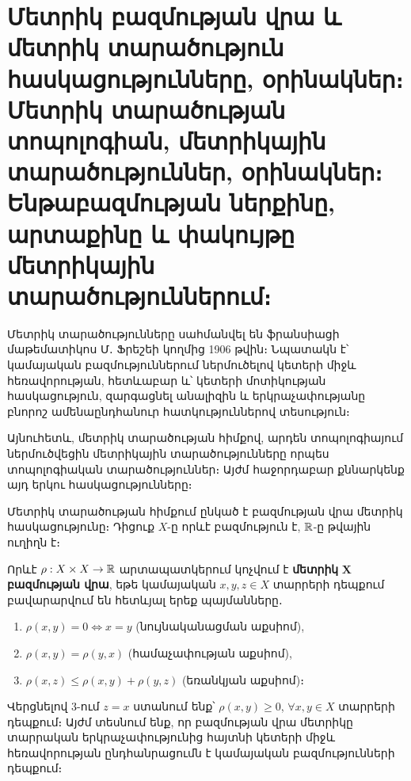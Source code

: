 \documentclass[./main.tex]{subfiles}
\begin{document}
\onehalfspacing


\section{Մետրիկ բազմության վրա և մետրիկ տարածություն հաս\-կա\-ցու\-թյուն\-ները, օրինակներ։ Մետրիկ տարածության տոպոլոգիան, մետրի\-կա\-յին տարածություններ, օրինակներ։ Ենթա\-բազ\-մու\-թյան ներքինը, արտաքինը և փակույթը մետրիկային տարածու\-թյուն\-նե\-րում։}\label{sec:7}



\par Մետրիկ տարածությունները սահմանվել են ֆրանսիացի մաթեմատիկոս Մ․ \linebreak Ֆրե\-շեի կողմից 1906 թվին։ Նպատակն է՝ կամայական բազմություններում ներ\-մու\-ծե\-լով կետերի միջև հեռավորության, հետևաբար և՝ կետերի մոտիկության հաս\-կա\-ցու\-թյուն, զարգացնել անալիզին և երկրաչափությանը բնորոշ ամենաընդհանուր հատ\-կություններով տեսություն։
\par Այնուհետև, մետրիկ տարածության հիմքով, արդեն տոպոլոգիայում ներմուծ\-վե\-ցին մետրիկային տարածությունները որպես տոպոլոգիական տարածություններ։ Այժմ հաջորդաբար քննարկենք այդ երկու հասկացությունները։
\par Մետրիկ տարածության հիմքում ընկած է բազմության վրա մետրիկ հասկացու\-թյունը։ Դիցուք $X$-ը որևէ բազմություն է, $\mathbb{R}$-ը թվային ուղիղն է։

\begin{definition}
    Որևէ $\rho:X \times X \rightarrow \mathbb{R}$ արտապատկերում կոչվում է \textbf{մետրիկ} $\boldsymbol{X}$ \textbf{բազ\-մու\-թյան վրա}, եթե կամայական $x, y, z \in X$ տարրերի դեպքում բավարար\-վում են հետևյալ երեք պայմանները․
\begin{enumerate}
    \item $\rho(x,y)=0 \Leftrightarrow x=y$ (նույնականացման աքսիոմ),
    \item $\rho(x,y)=\rho(y,x)$ (համաչափության աքսիոմ),
    \item $\rho(x,z) \leq \rho(x,y)+\rho(y,z)$ (եռանկյան աքսիոմ)։
\end{enumerate}
\end{definition}

\begin{hetevanqax}\label{ch7cor1}
Վերցնելով 3-ում $z=x$ ստանում ենք՝ $\rho(x,y) \geq 0$, $\forall x,y \in X$ տարրերի դեպքում։ Այժմ տեսնում ենք, որ բազմության վրա մետրիկը տարրական երկրաչափությունից հայտնի կետերի միջև հեռավորության ընդհանրա\-ցումն է կա\-մա\-յա\-կան բազմությունների դեպքում։
\end{hetevanqax}
\end{document}
